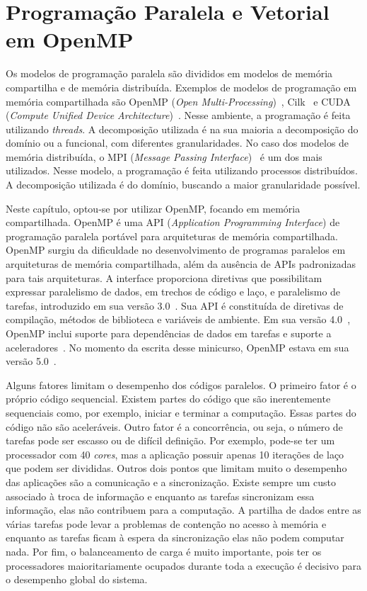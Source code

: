 \section{Programação Paralela e Vetorial em OpenMP}\label{sec:openmp}

Os modelos de programação paralela são divididos em modelos de memória compartilha e de memória distribuída. Exemplos de modelos de programação em memória compartilhada são OpenMP (\emph{Open Multi-Processing})~\cite{openmp,chapman2008using}, Cilk~\cite{reinders2012overview,robison2013composable} e CUDA (\emph{Compute Unified Device Architecture})~\cite{cook2012cuda,kirk2016programming}. Nesse ambiente, a programação é feita utilizando \textit{threads}. A decomposição utilizada é na sua maioria a decomposição do domínio ou a funcional, com diferentes granularidades. No caso dos modelos de memória distribuída, o MPI (\emph{Message Passing Interface})~\cite{gropp1999using,pitt2017introduction} é um dos mais utilizados. Nesse modelo, a programação é feita utilizando processos distribuídos. A decomposição utilizada é do domínio, buscando a maior granularidade possível. 

Neste capítulo, optou-se por utilizar OpenMP, focando em memória compartilhada. OpenMP é uma API (\emph{Application Programming Interface}) de programação paralela portável para arquiteturas de memória compartilhada. OpenMP surgiu da dificuldade no desenvolvimento de programas paralelos em arquiteturas de memória compartilhada, além da ausência de APIs padronizadas para tais arquiteturas. A interface proporciona diretivas que possibilitam expressar paralelismo de dados, em trechos de código e laço, e paralelismo de tarefas, introduzido em sua versão 3.0~\cite{AyguadeCoptyDuranEtAl2009}. Sua API é constituída de diretivas de compilação, métodos de biblioteca e variáveis de ambiente. Em sua versão 4.0~\cite{martineau2016evaluating}, OpenMP inclui suporte para dependências de dados em tarefas e suporte a aceleradores~\cite{openmp}. No momento da escrita desse minicurso, OpenMP estava em sua versão 5.0~\cite{de2018ongoing}.

Alguns fatores limitam o desempenho dos códigos paralelos. O primeiro fator é o próprio código sequencial. Existem partes do código que são inerentemente sequenciais como, por exemplo, iniciar e terminar a computação. Essas partes do código não são aceleráveis. Outro fator é a concorrência, ou seja, o número de tarefas pode ser escasso ou de difícil definição. Por exemplo, pode-se ter um processador com 40 \textit{cores}, mas a aplicação possuir apenas 10 iterações de laço que podem ser divididas. Outros dois pontos que limitam muito o desempenho das aplicações são a comunicação e a sincronização. Existe sempre um custo associado à troca de informação e enquanto as tarefas sincronizam essa informação, elas não contribuem para a computação. 
A partilha de dados entre as várias tarefas pode levar a problemas de contenção no acesso à memória e enquanto as tarefas ficam à espera da sincronização elas não podem computar nada. Por fim, o balanceamento de carga é muito importante, pois ter os processadores maioritariamente ocupados durante toda a execução é decisivo para o desempenho global do sistema.

